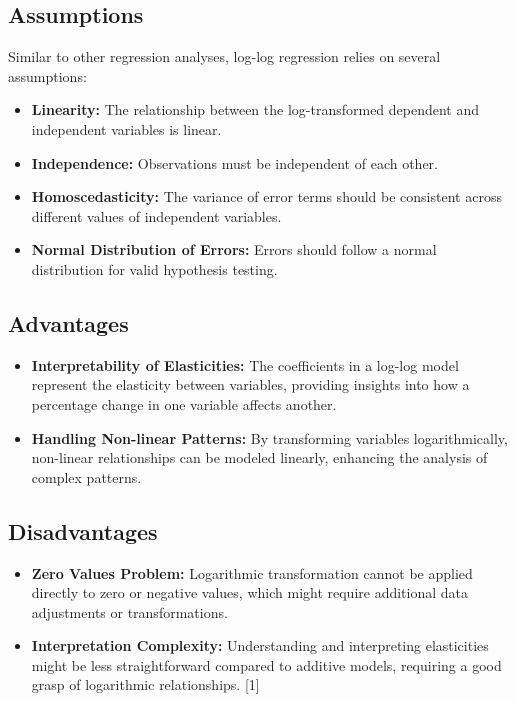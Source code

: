\documentclass[
  letterpaper,
  DIV=11,
  numbers=noendperiod]{scrreport}
\providecommand{\tightlist}{%
  \setlength{\itemsep}{0pt}\setlength{\parskip}{0pt}}\usepackage{longtable,booktabs,array}
\begin{document}
\subsection{Assumptions}\label{assumptions}

Similar to other regression analyses, log-log regression relies on
several assumptions:

\begin{itemize}
\tightlist
\item
  \textbf{Linearity:} The relationship between the log-transformed
  dependent and independent variables is linear.
\item
  \textbf{Independence:} Observations must be independent of each other.
\item
  \textbf{Homoscedasticity:} The variance of error terms should be
  consistent across different values of independent variables.
\item
  \textbf{Normal Distribution of Errors:} Errors should follow a normal
  distribution for valid hypothesis testing.
\end{itemize}

\subsection{Advantages}\label{advantages}

\begin{itemize}
\tightlist
\item
  \textbf{Interpretability of Elasticities:} The coefficients in a
  log-log model represent the elasticity between variables, providing
  insights into how a percentage change in one variable affects another.
\item
  \textbf{Handling Non-linear Patterns:} By transforming variables
  logarithmically, non-linear relationships can be modeled linearly,
  enhancing the analysis of complex patterns.
\end{itemize}

\subsection{Disadvantages}\label{disadvantages}

\begin{itemize}
\tightlist
\item
  \textbf{Zero Values Problem:} Logarithmic transformation cannot be
  applied directly to zero or negative values, which might require
  additional data adjustments or transformations.
\item
  \textbf{Interpretation Complexity:} Understanding and interpreting
  elasticities might be less straightforward compared to additive
  models, requiring a good grasp of logarithmic relationships. {[}1{]}
\end{itemize}
\end{document}
